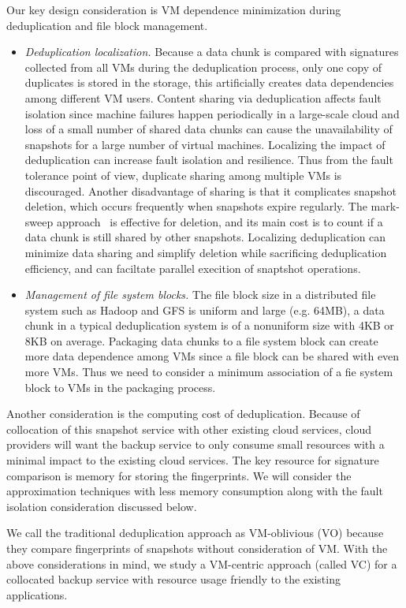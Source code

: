 Our key design consideration is VM dependence minimization during deduplication and file block management.
\begin{itemize}
\item {\em Deduplication localization.}
Because a data chunk is compared with signatures collected from all VMs during
the deduplication process, only one copy of duplicates is stored in the storage,
this artificially creates data dependencies among different VM users. 
Content sharing via deduplication affects fault isolation since machine failures happen periodically 
in a large-scale cloud and
loss of a small number of shared data chunks can 
cause the unavailability of snapshots for a large number of virtual machines.
Localizing the impact of deduplication can increase fault isolation and resilience.
Thus from the fault tolerance point of view,  duplicate sharing among multiple VMs is 
discouraged. 
Another disadvantage of sharing is that it complicates snapshot deletion, 
which  occurs frequently when snapshots expire regularly. 
The mark-sweep approach~\cite{Guo2011} is effective for deletion, and its main cost
is to count if a data chunk is still shared by other snapshots.
Localizing deduplication can  minimize data sharing and simplify deletion while sacrificing 
deduplication efficiency, and  can faciltate parallel execition of snaptshot operations.
\item{\em  Management of file system blocks.}
The file block size in a distributed file system such as  Hadoop and GFS is uniform and large (e.g.  64MB),
 a data chunk in a typical deduplication system is of a nonuniform size with 4KB or 8KB on average.
Packaging data chunks to a file system block can create more data dependence among VMs
since a file block can be shared with even more VMs.
Thus we need to consider a minimum association of a fie system block to VMs in the packaging process.
\end{itemize}

Another consideration is the computing cost of deduplication.
Because of collocation of this snapshot service with other existing cloud services, 
cloud providers will want the backup service to only consume small resources
with a minimal impact to the existing cloud services.
The key resource for signature comparison  is memory for storing the fingerprints. 
We will consider the approximation techniques with less memory consumption along 
with the fault isolation consideration discussed below. 

We call the traditional deduplication approach as   VM-oblivious (VO)
because they compare fingerprints of snapshots without consideration of VM.
With the above  considerations in mind, we study a 
VM-centric approach (called VC)
for a collocated backup service with resource usage friendly
to the existing applications.  


